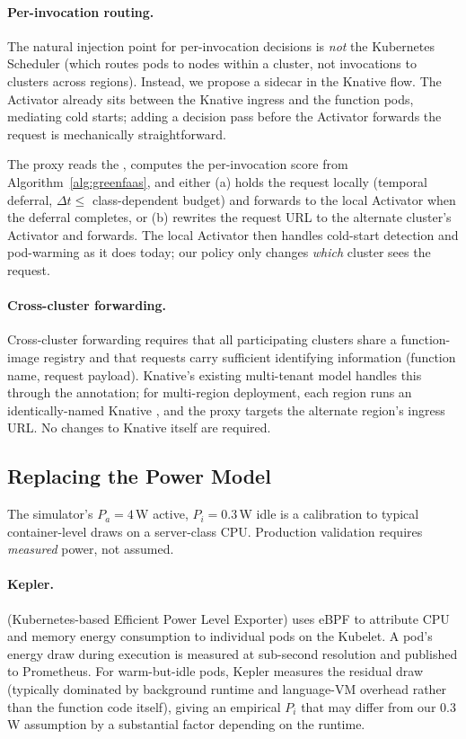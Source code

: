 \paragraph{Per-invocation routing.}
The natural injection point for per-invocation \GreenFaaS{}
decisions is \emph{not} the Kubernetes Scheduler (which routes pods
to nodes within a cluster, not invocations to clusters across
regions). Instead, we propose a sidecar in the Knative
 flow. The Activator already sits between the Knative
 ingress and the function pods, mediating cold starts;
adding a \GreenFaaS{} decision pass before the Activator forwards
the request is mechanically straightforward.

The proxy reads the , computes the per-invocation
score from Algorithm~\ref{alg:greenfaas}, and either (a) holds the
request locally (temporal deferral, $\Delta t \le$ class-dependent
budget) and forwards to the local Activator when the deferral
completes, or (b) rewrites the request URL to the alternate cluster's
Activator and forwards. The local Activator then handles cold-start
detection and pod-warming as it does today; our policy only changes
\emph{which} cluster sees the request.

\paragraph{Cross-cluster forwarding.}
Cross-cluster forwarding requires that all participating clusters
share a function-image registry and that requests carry sufficient
identifying information (function name, request payload). Knative's
existing multi-tenant model handles this through the
 annotation; for
multi-region deployment, each region runs an identically-named
Knative , and the proxy targets the alternate region's
ingress URL. No changes to Knative itself are required.

\subsection{Replacing the Power Model}
\label{sec:deployment:power}

The simulator's $P_a = 4$\,W active, $P_i = 0.3$\,W idle is a
calibration to typical container-level draws on a server-class CPU.
Production validation requires \emph{measured} power, not assumed.

\paragraph{Kepler.}
 (Kubernetes-based Efficient Power Level Exporter)
\citep{kepler} uses eBPF to attribute CPU and memory energy
consumption to individual pods on the Kubelet. A pod's energy draw
during execution is measured at sub-second resolution and published
to Prometheus. For warm-but-idle pods, Kepler measures the residual
draw (typically dominated by background runtime and language-VM
overhead rather than the function code itself), giving an empirical
$P_i$ that may differ from our 0.3\,W assumption by a substantial
factor depending on the runtime.

